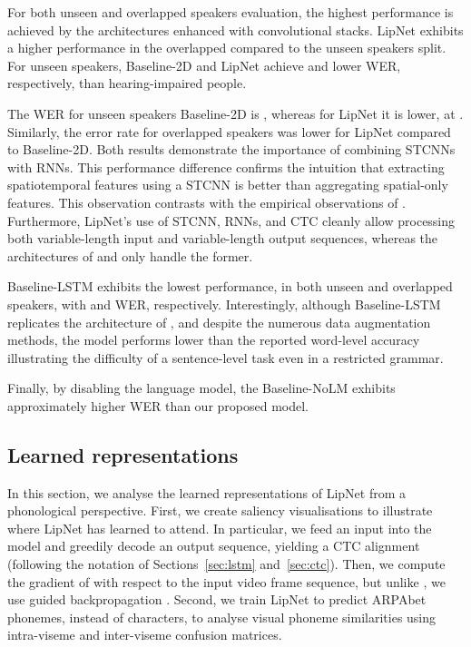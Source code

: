\documentclass{article}
\begin{document}
For both unseen and overlapped speakers evaluation, the highest performance is achieved by the architectures enhanced with convolutional stacks. 
LipNet exhibits a  higher performance in the overlapped compared to the unseen speakers split.
For unseen speakers, Baseline-2D and LipNet achieve  and  lower WER, respectively, than hearing-impaired people. 

The WER for unseen speakers Baseline-2D is , whereas for LipNet it is  lower, at . Similarly, the error rate for overlapped speakers was  lower for LipNet compared to Baseline-2D. Both results demonstrate the importance of combining STCNNs with RNNs.
This performance difference confirms the intuition that extracting spatiotemporal features using a STCNN is better than aggregating spatial-only features. 
This observation contrasts with the empirical observations of \cite{chung2016lip}.
Furthermore, LipNet's use of STCNN, RNNs, and CTC cleanly allow processing both variable-length input and variable-length output sequences, whereas the architectures of \citet{chung2016lip} and \citet{chung2016out} only handle the former.

Baseline-LSTM exhibits the lowest performance, in both unseen and overlapped speakers, with  and  WER, respectively. 
Interestingly, although Baseline-LSTM replicates the architecture of \citet{wand2016lipreading}, and despite the numerous data augmentation methods, the model performs  lower than the reported  word-level accuracy illustrating the difficulty of a sentence-level task even in a restricted grammar.

Finally, by disabling the language model, the Baseline-NoLM exhibits approximately  higher WER than our proposed model.
 
\subsection{Learned representations}

In this section, we analyse the learned representations of LipNet from a phonological perspective. First, we create saliency visualisations \citep{simonyan2013deep,zeiler2014visualizing} to illustrate where LipNet has learned to attend. In particular, we feed an input into the model and greedily decode an output sequence, yielding a CTC alignment  (following the notation of Sections~\ref{sec:lstm} and~\ref{sec:ctc}). Then, we compute the gradient of  with respect to the input video frame sequence, but unlike \citet{simonyan2013deep}, we use guided backpropagation \citep{springenberg2014striving}. Second, we train LipNet to predict ARPAbet phonemes, instead of characters, to analyse visual phoneme similarities using intra-viseme and inter-viseme confusion matrices.
\end{document}
